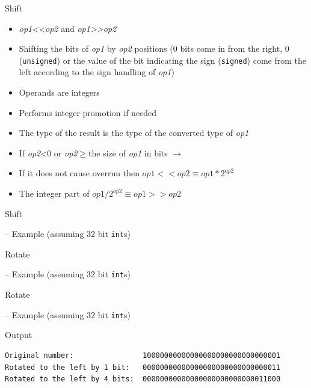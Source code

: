 \documentclass[usenames,dvipsnames,aspectratio=169]{beamer}
\begin{document}
\begin{frame}{Shift}
  \begin{itemize}
    \item \emph{op1<{<}op2} and \emph{op1>{>}op2}
    \item Shifting the bits of \emph{op1} by \emph{op2} positions (0 bits come in from the right, 0 (\texttt{unsigned}) or the value of the bit indicating the sign (\texttt{signed}) come from the left according to the sign handling of \emph{op1})
    \item Operands are integers
    \item Performs integer promotion if needed
    \item The type of the result is the type of the converted type of \emph{op1}
    \item If \emph{op2}{<}0 or \emph{op2}$\geq$the size of \emph{op1} in bits 
$\to$ 
    \item If it does not cause overrun then $op\mathit{1}<<op\mathit{2} \equiv op\mathit{1}*2^{op\mathit{2}}$
    \item The integer part of $op\mathit{1}/2^{op\mathit{2}} \equiv op\mathit{1}>>op\mathit{2}$
  \end{itemize}
\end{frame}

\begin{frame}{Shift}
  \small
  \begin{exampleblock}{ -- Example (assuming 32 bit \texttt{int}s)}
    
  \end{exampleblock}
\end{frame}

\begin{frame}{Rotate}
  \scriptsize
  \begin{exampleblock}{ -- Example (assuming 32 bit \texttt{int}s)}
    \vspace{-.2cm}
    
    \vspace{-.2cm}
  \end{exampleblock}
\end{frame}

\begin{frame}[fragile]{Rotate}
  \scriptsize
  \begin{exampleblock}{ -- Example (assuming 32 bit \texttt{int}s)}
    
  \end{exampleblock}
  \begin{block}{Output}
    \begin{verbatim}
Original number:                10000000000000000000000000000001
Rotated to the left by 1 bit:   00000000000000000000000000000011
Rotated to the left by 4 bits:  00000000000000000000000000011000
    \end{verbatim}
  \end{block}
\end{frame}
\end{document}
